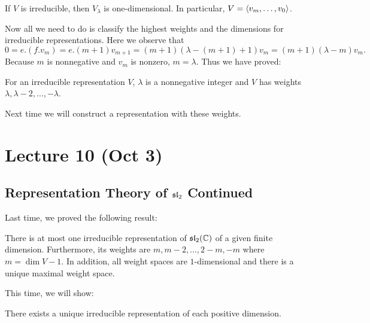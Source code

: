 \documentclass[twoside, 10pt]{article}
\begin{document}
    \begin{cor} If $V$ is irreducible, then $V_{\lambda}$ is one-dimensional.
    In particular, $V = \langle v_m, \ldots, v_0\rangle$.  \end{cor}

    Now all we need to do is classify the highest weights and the dimensions
    for irreducible representations. Here we observe that \[0 = e.(f.v_m) =
    e.(m+1)v_{m+1} = (m+1)(\lambda - (m+1)+1)v_m = (m+1)(\lambda - m)v_m.\]
    Because $m$ is nonnegative and $v_m$ is nonzero, $m = \lambda$. Thus we
    have proved:

    \begin{thm} For an irreducible representation $V$, $\lambda$ is a
    nonnegative integer and $V$ has weights $\lambda, \lambda - 2, \ldots,
-\lambda$.  \end{thm}

    Next time we will construct a representation with these weights.

    \section{Lecture 10 (Oct 3)}%

    \subsection{Representation Theory of $\mathfrak{sl}_2$ Continued}%
    \label{sub:representation_theory_of_sl_2_continued}
    
    Last time, we proved the following result: \begin{thm} There is at most one
        irreducible representation of $\mathfrak{sl}_2(\mathbb{C})$ of a given finite
        dimension. Furthermore, its weights are $m, m-2, \ldots, 2-m, -m$ where
        $m = \dim V - 1$. In addition, all weight spaces are $1$-dimensional
        and there is a unique maximal weight space.  \end{thm}

    This time, we will show: \begin{thm} There exists a unique irreducible
    representation of each positive dimension.  \end{thm}
\end{document}
